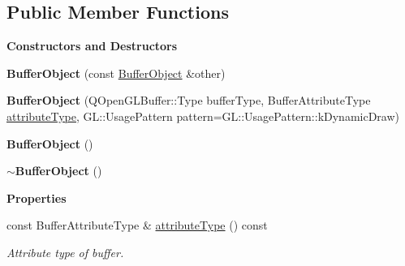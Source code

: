 \subsection*{Public Member Functions}
\begin{Indent}\textbf{ Constructors and Destructors}\par
\begin{DoxyCompactItemize}
\item 
\mbox{\label{classrev_1_1_g_l_1_1_buffer_object_a2af7b59013958e1e5a0d10d81a15c64f}} 
{\bfseries Buffer\+Object} (const \mbox{\hyperlink{classrev_1_1_g_l_1_1_buffer_object}{Buffer\+Object}} \&other)
\item 
\mbox{\label{classrev_1_1_g_l_1_1_buffer_object_acf4fa1e76930f73a4877dce3df53f801}} 
{\bfseries Buffer\+Object} (Q\+Open\+G\+L\+Buffer\+::\+Type buffer\+Type, Buffer\+Attribute\+Type \mbox{\hyperlink{classrev_1_1_g_l_1_1_buffer_object_a58c20873500175e3539430dbf63ebbcf}{attribute\+Type}}, G\+L\+::\+Usage\+Pattern pattern=G\+L\+::\+Usage\+Pattern\+::k\+Dynamic\+Draw)
\item 
\mbox{\label{classrev_1_1_g_l_1_1_buffer_object_a440073b7d0ccda5e0612c0c35c6e774b}} 
{\bfseries Buffer\+Object} ()
\item 
\mbox{\label{classrev_1_1_g_l_1_1_buffer_object_a68ad733b43e0921817cb8762077f0c42}} 
{\bfseries $\sim$\+Buffer\+Object} ()
\end{DoxyCompactItemize}
\end{Indent}
\begin{Indent}\textbf{ Properties}\par
\begin{DoxyCompactItemize}
\item 
\mbox{\label{classrev_1_1_g_l_1_1_buffer_object_a58c20873500175e3539430dbf63ebbcf}} 
const Buffer\+Attribute\+Type \& \mbox{\hyperlink{classrev_1_1_g_l_1_1_buffer_object_a58c20873500175e3539430dbf63ebbcf}{attribute\+Type}} () const
\begin{DoxyCompactList}\small\item\em Attribute type of buffer. \end{DoxyCompactList}\end{DoxyCompactItemize}
\end{Indent}
